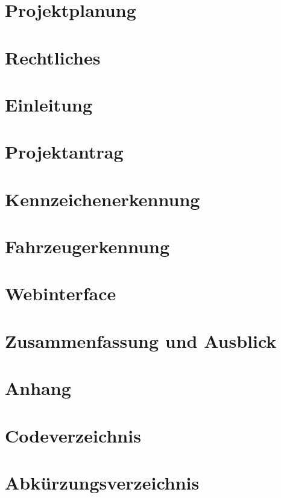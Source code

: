 \documentclass[hidelinks,12pt,a4paper,twoside]{article}
\begin{document}
\section{Projektplanung}
\pagebreak


\section{Rechtliches}
\pagebreak


\section{Einleitung}

\pagebreak


\section{Projektantrag}

\pagebreak


\section{Kennzeichenerkennung}

\pagebreak


\section{Fahrzeugerkennung}

\pagebreak


\section{Webinterface}

\pagebreak


\section{Zusammenfassung und Ausblick}

\pagebreak


\section{Anhang}

\pagebreak


\listoffigures
{}
\pagebreak


\listoftables
{}
\pagebreak


\section*{Codeverzeichnis}
\pagebreak


\section*{Abkürzungsverzeichnis}

\pagebreak


\printbibliography[title=Literaturverzeichnis]
\pagebreak
\end{document}
